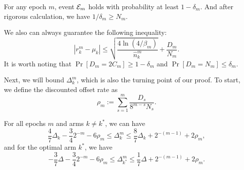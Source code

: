 \begin{lemma}
\label{lem:pemsog} %
     For any epoch $m$, event ${\mathcal{E}}_m$ holds with probability at least $1 - \delta_m$. And after rigorous calculation, we have $1 / \delta_m \geq N_m$.
\end{lemma}
We also can always guarantee the following inequality:
\[|r_k^m - \mu_k| \leq \sqrt{\frac{4\ln(4 /\beta_m)}{\hat{n}_k^m}} + \frac{D_m}{N_m}.\]
It is worth noting that $\Pr[D_m = 2C_m] \geq 1 - \delta_m$ and $\Pr[D_m = N_m] \leq \delta_m$.

Next, we will bound $\Delta_k^m$, which is also the turning point of our proof. To start, we define the discounted offset rate as
\[\rho_m := \sum_{s=1}^m \frac{D_s}{8^{m-s}N_s}.\]

\begin{lemma}
\label{lem:bsgsog} %
    For all epochs $m$ and arms $k \neq k^*$, we can have
    \[\frac{4}{7}\Delta_k - \frac{3}{4}2^{-m} - 6\rho_m \leq \Delta_k^m \leq \frac{8}{7}\Delta_k + 2^{-(m-1)} + 2\rho_m,\]
    and for the optimal arm $k^*$, we have
    \[-\frac{3}{7}\Delta - \frac{3}{4}2^{-m} - 6\rho_m \leq \Delta_{k^*}^m \leq \frac{1}{7}\Delta + 2^{-(m-1)} + 2\rho_m.\]
\end{lemma}

